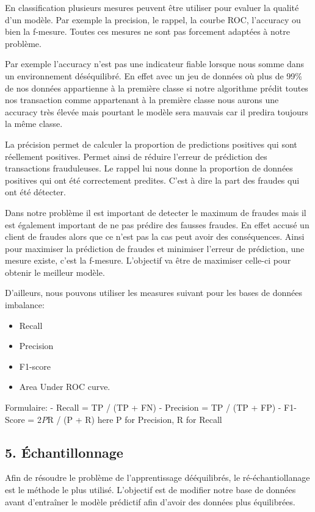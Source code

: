 \documentclass[11pt]{article}
\providecommand{\tightlist}{%
      \setlength{\itemsep}{0pt}\setlength{\parskip}{0pt}}
\begin{document}
En classification plusieurs mesures peuvent être utiliser pour evaluer
la qualité d'un modèle. Par exemple la precision, le rappel, la courbe
ROC, l'accuracy ou bien la f-mesure. Toutes ces mesures ne sont pas
forcement adaptées à notre problème.

Par exemple l'accuracy n'est pas une indicateur fiable lorsque nous
somme dans un environnement déséquilibré. En effet avec un jeu de
données où plus de 99\% de nos données appartienne à la première classe
si notre algorithme prédit toutes nos transaction comme appartenant à la
première classe nous aurons une accuracy très élevée mais pourtant le
modèle sera mauvais car il predira toujours la même classe.

La précision permet de calculer la proportion de predictions positives
qui sont réellement positives. Permet ainsi de réduire l'erreur de
prédiction des transactions frauduleuses. Le rappel lui nous donne la
proportion de données positives qui ont été correctement predites. C'est
à dire la part des fraudes qui ont été détecter.

Dans notre problème il est important de detecter le maximum de fraudes
mais il est également important de ne pas prédire des fausses fraudes.
En effet accusé un client de fraudes alors que ce n'est pas la cas peut
avoir des conséquences. Ainsi pour maximiser la prédiction de fraudes et
minimiser l'erreur de prédiction, une mesure existe, c'est la f-mesure.
L'objectif va être de maximiser celle-ci pour obtenir le meilleur
modèle.

D'ailleurs, nous pouvons utiliser les measures suivant pour les bases de
données imbalance:

\begin{itemize}
\tightlist
\item
  Recall
\item
  Precision
\item
  F1-score
\item
  Area Under ROC curve.
\end{itemize}

    Formulaire: - Recall = TP / (TP + FN) - Precision = TP / (TP + FP) -
F1-Score = 2\emph{P}R / (P + R) here P for Precision, R for Recall

    \hypertarget{uxe9chantillonnage}{%
\subsection{5. Échantillonnage}\label{uxe9chantillonnage}}

Afin de résoudre le problème de l'apprentissage dééquilibrés, le
ré-échantiollanage est le méthode le plus utilisé. L'objectif est de
modifier notre base de données avant d'entraîner le modèle prédictif
afin d'avoir des données plus équilibrées.
\end{document}
